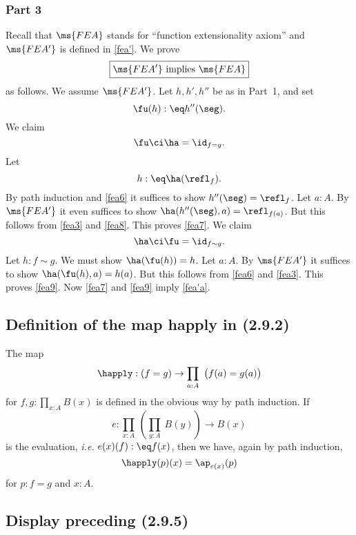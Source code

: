 \documentclass[12pt]{article}
\begin{document}
\subsubsection{Part 3}

Recall that $\ms{FEA}$ stands for ``function extensionality axiom'' and $\ms{FEA'}$ is defined in \eqref{fea'}. We prove 
\begin{equation}\label{fea'a}
\boxed{\ms{FEA'}\text{ implies } \ms{FEA}}
\end{equation}
as follows. We assume $\ms{FEA'}$. Let $h,h',h''$ be as in Part~1, and set 
\begin{equation}\label{fea6}
\fu(h):\eq h''(\seg).
\end{equation} 
We claim 
\begin{equation}\label{fea7}
\fu\ci\ha=\id_{f=g}.
\end{equation} 
Let 
\begin{equation}\label{fea8}
h:\eq\ha(\refl_f).
\end{equation} 
By path induction and \eqref{fea6} it suffices to show $h''(\seg)=\refl_f$. Let $a:A$. By $\ms{FEA'}$ it even suffices to show $\ha(h''(\seg),a)=\refl_{f(a)}$. But this follows from \eqref{fea3} and \eqref{fea8}. This proves \eqref{fea7}. 
We claim 
\begin{equation}\label{fea9}
\ha\ci\fu=\id_{f\sim g}.
\end{equation} 
Let $h:f\sim g$. We must show $\ha(\fu(h))=h$. Let $a:A$. By $\ms{FEA'}$ it suffices to show $\ha(\fu(h),a)=h(a)$. But this follows from \eqref{fea6} and \eqref{fea3}. This proves \eqref{fea9}. Now \eqref{fea7} and \eqref{fea9} imply \eqref{fea'a}. 


\subsection{Definition of the map \textsf{happly} in (2.9.2)}

The map 
$$
\happly:(f=g)\to\prod_{a:A}\ \big(f(a)=g(a)\big)
$$ 
for $f,g:\prod_{x:A}B(x)$ is defined in the obvious way by path induction. If 
$$
e:\prod_{x:A}\ \left(\prod_{y:A}\ B(y)\right)\to B(x)
$$ 
is the evaluation, \emph{i.e.} $e(x)(f):\eq f(x)$, then we have, again by path induction, 
$$
\happly(p)(x)=\ap_{e(x)}(p)
$$ 
for $p:f=g$ and $x:A$. 


\subsection{Display preceding (2.9.5)}
\end{document}
